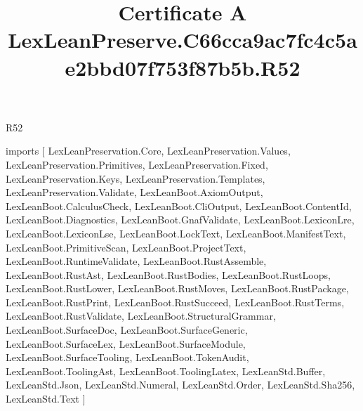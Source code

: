 \begin{lexlean}{R52}
\title{Certificate A LexLeanPreserve.C66cca9ac7fc4c5ae2bbd07f753f87b5b.R52}
\begin{coremodule}
imports [
  LexLeanPreservation.Core,
  LexLeanPreservation.Values,
  LexLeanPreservation.Primitives,
  LexLeanPreservation.Fixed,
  LexLeanPreservation.Keys,
  LexLeanPreservation.Templates,
  LexLeanPreservation.Validate,
  LexLeanBoot.AxiomOutput,
  LexLeanBoot.CalculusCheck,
  LexLeanBoot.CliOutput,
  LexLeanBoot.ContentId,
  LexLeanBoot.Diagnostics,
  LexLeanBoot.GnafValidate,
  LexLeanBoot.LexiconLre,
  LexLeanBoot.LexiconLse,
  LexLeanBoot.LockText,
  LexLeanBoot.ManifestText,
  LexLeanBoot.PrimitiveScan,
  LexLeanBoot.ProjectText,
  LexLeanBoot.RuntimeValidate,
  LexLeanBoot.RustAssemble,
  LexLeanBoot.RustAst,
  LexLeanBoot.RustBodies,
  LexLeanBoot.RustLoops,
  LexLeanBoot.RustLower,
  LexLeanBoot.RustMoves,
  LexLeanBoot.RustPackage,
  LexLeanBoot.RustPrint,
  LexLeanBoot.RustSucceed,
  LexLeanBoot.RustTerms,
  LexLeanBoot.RustValidate,
  LexLeanBoot.StructuralGrammar,
  LexLeanBoot.SurfaceDoc,
  LexLeanBoot.SurfaceGeneric,
  LexLeanBoot.SurfaceLex,
  LexLeanBoot.SurfaceModule,
  LexLeanBoot.SurfaceTooling,
  LexLeanBoot.TokenAudit,
  LexLeanBoot.ToolingAst,
  LexLeanBoot.ToolingLatex,
  LexLeanStd.Buffer,
  LexLeanStd.Json,
  LexLeanStd.Numeral,
  LexLeanStd.Order,
  LexLeanStd.Sha256,
  LexLeanStd.Text
]


\end{coremodule}
\end{lexlean}
